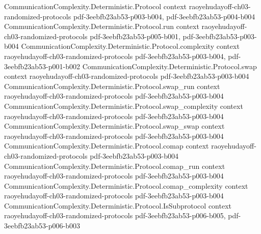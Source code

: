\begin{theorem}
\label{CommunicationComplexity.Functions.Equality.equalityHashProtocol_complexity}
\leanok
{}
\proofstep
  {CommunicationComplexity.Deterministic.Protocol}
  {context}
  {raoyehudayoff-ch03-randomized-protocols}
  {pdf-3eebfb23ab53-p003-b004,
    pdf-3eebfb23ab53-p004-b004}
\proofstep
  {CommunicationComplexity.Deterministic.Protocol.run}
  {context}
  {raoyehudayoff-ch03-randomized-protocols}
  {pdf-3eebfb23ab53-p005-b001,
    pdf-3eebfb23ab53-p003-b004}
\proofstep
  {CommunicationComplexity.Deterministic.Protocol.complexity}
  {context}
  {raoyehudayoff-ch03-randomized-protocols}
  {pdf-3eebfb23ab53-p003-b004,
    pdf-3eebfb23ab53-p001-b002}
\proofstep
  {CommunicationComplexity.Deterministic.Protocol.swap}
  {context}
  {raoyehudayoff-ch03-randomized-protocols}
  {pdf-3eebfb23ab53-p003-b004}
\proofstep
  {CommunicationComplexity.Deterministic.Protocol.swap_run}
  {context}
  {raoyehudayoff-ch03-randomized-protocols}
  {pdf-3eebfb23ab53-p003-b004}
\proofstep
  {CommunicationComplexity.Deterministic.Protocol.swap_complexity}
  {context}
  {raoyehudayoff-ch03-randomized-protocols}
  {pdf-3eebfb23ab53-p003-b004}
\proofstep
  {CommunicationComplexity.Deterministic.Protocol.swap_swap}
  {context}
  {raoyehudayoff-ch03-randomized-protocols}
  {pdf-3eebfb23ab53-p003-b004}
\proofstep
  {CommunicationComplexity.Deterministic.Protocol.comap}
  {context}
  {raoyehudayoff-ch03-randomized-protocols}
  {pdf-3eebfb23ab53-p003-b004}
\proofstep
  {CommunicationComplexity.Deterministic.Protocol.comap_run}
  {context}
  {raoyehudayoff-ch03-randomized-protocols}
  {pdf-3eebfb23ab53-p003-b004}
\proofstep
  {CommunicationComplexity.Deterministic.Protocol.comap_complexity}
  {context}
  {raoyehudayoff-ch03-randomized-protocols}
  {pdf-3eebfb23ab53-p003-b004}
\proofstep
  {CommunicationComplexity.Deterministic.Protocol.IsSubprotocol}
  {context}
  {raoyehudayoff-ch03-randomized-protocols}
  {pdf-3eebfb23ab53-p006-b005,
    pdf-3eebfb23ab53-p006-b003}

\end{theorem}

